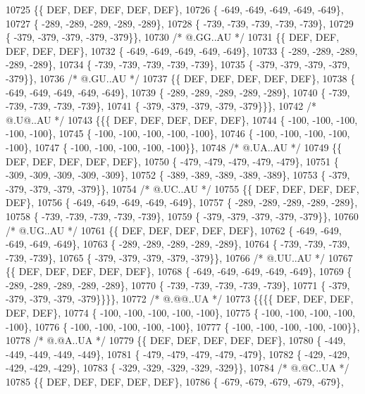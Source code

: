 \begin{DoxyCode}
10725 \{\{  DEF,  DEF,  DEF,  DEF,  DEF\},
10726 \{ -649, -649, -649, -649, -649\},
10727 \{ -289, -289, -289, -289, -289\},
10728 \{ -739, -739, -739, -739, -739\},
10729 \{ -379, -379, -379, -379, -379\}\},
10730 \textcolor{comment}{/*  @.GG..AU */}
10731 \{\{  DEF,  DEF,  DEF,  DEF,  DEF\},
10732 \{ -649, -649, -649, -649, -649\},
10733 \{ -289, -289, -289, -289, -289\},
10734 \{ -739, -739, -739, -739, -739\},
10735 \{ -379, -379, -379, -379, -379\}\},
10736 \textcolor{comment}{/*  @.GU..AU */}
10737 \{\{  DEF,  DEF,  DEF,  DEF,  DEF\},
10738 \{ -649, -649, -649, -649, -649\},
10739 \{ -289, -289, -289, -289, -289\},
10740 \{ -739, -739, -739, -739, -739\},
10741 \{ -379, -379, -379, -379, -379\}\}\},
10742 \textcolor{comment}{/*  @.U@..AU */}
10743 \{\{\{  DEF,  DEF,  DEF,  DEF,  DEF\},
10744 \{ -100, -100, -100, -100, -100\},
10745 \{ -100, -100, -100, -100, -100\},
10746 \{ -100, -100, -100, -100, -100\},
10747 \{ -100, -100, -100, -100, -100\}\},
10748 \textcolor{comment}{/*  @.UA..AU */}
10749 \{\{  DEF,  DEF,  DEF,  DEF,  DEF\},
10750 \{ -479, -479, -479, -479, -479\},
10751 \{ -309, -309, -309, -309, -309\},
10752 \{ -389, -389, -389, -389, -389\},
10753 \{ -379, -379, -379, -379, -379\}\},
10754 \textcolor{comment}{/*  @.UC..AU */}
10755 \{\{  DEF,  DEF,  DEF,  DEF,  DEF\},
10756 \{ -649, -649, -649, -649, -649\},
10757 \{ -289, -289, -289, -289, -289\},
10758 \{ -739, -739, -739, -739, -739\},
10759 \{ -379, -379, -379, -379, -379\}\},
10760 \textcolor{comment}{/*  @.UG..AU */}
10761 \{\{  DEF,  DEF,  DEF,  DEF,  DEF\},
10762 \{ -649, -649, -649, -649, -649\},
10763 \{ -289, -289, -289, -289, -289\},
10764 \{ -739, -739, -739, -739, -739\},
10765 \{ -379, -379, -379, -379, -379\}\},
10766 \textcolor{comment}{/*  @.UU..AU */}
10767 \{\{  DEF,  DEF,  DEF,  DEF,  DEF\},
10768 \{ -649, -649, -649, -649, -649\},
10769 \{ -289, -289, -289, -289, -289\},
10770 \{ -739, -739, -739, -739, -739\},
10771 \{ -379, -379, -379, -379, -379\}\}\}\},
10772 \textcolor{comment}{/*  @.@@..UA */}
10773 \{\{\{\{  DEF,  DEF,  DEF,  DEF,  DEF\},
10774 \{ -100, -100, -100, -100, -100\},
10775 \{ -100, -100, -100, -100, -100\},
10776 \{ -100, -100, -100, -100, -100\},
10777 \{ -100, -100, -100, -100, -100\}\},
10778 \textcolor{comment}{/*  @.@A..UA */}
10779 \{\{  DEF,  DEF,  DEF,  DEF,  DEF\},
10780 \{ -449, -449, -449, -449, -449\},
10781 \{ -479, -479, -479, -479, -479\},
10782 \{ -429, -429, -429, -429, -429\},
10783 \{ -329, -329, -329, -329, -329\}\},
10784 \textcolor{comment}{/*  @.@C..UA */}
10785 \{\{  DEF,  DEF,  DEF,  DEF,  DEF\},
10786 \{ -679, -679, -679, -679, -679\},

\end{DoxyCode}
